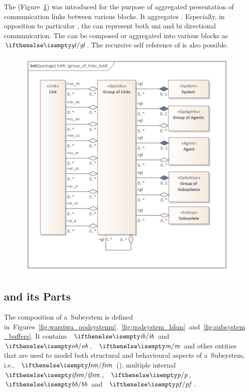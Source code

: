 \documentclass[11pt,oneside,a4paper]{article}
\newcommand{\Figure}[0]{Figure}
\newcommand{\Figures}[0]{Figures}
\begin{document}
The \GroupofLinks{} (\Figure{}~\ref{fig:group_of_links_bdd}) was introduced for the purpose of aggregated presentation of communication links between various blocks. It aggregates \Links{}. Especially, in opposition to particular \Links{}, the \GroupofLinks{} can represent both uni and bi directional communication. The \GroupofLinks{} can be composed or aggregated into various blocks as $\egl{}$. The recursive self reference of \GroupsofLinks{} is also possible.
	
\begin{figure}[H]
	\centering
	\begin{center}
		{\includegraphics[width=.65\columnwidth]{img/basic_earl_model/group_of_links_bdd.png}}
	\end{center}
	\caption{\GroupofLinks{}} 
	\label{fig:group_of_links_bdd}
\end{figure}	

	
	\subsection{\Subsystem{} and its Parts}
	The composition of a~Subsystem{} is defined in~\Figures{}~\ref{fig:warstwa_podsystemu},~\ref{fig:podsystem_hfsm}~and~\ref{fig:subsystem_buffers}. It contains \InputBuffers{}~$\eib{}$ and \OutputBuffers{}~$\eob{}$,
	\InternalMemory{}~$\emb{}$ and other entities that are used to model both structural and behavioural aspects of a~Subsystem{},
	i.e., \Fsm{}~$\efsm{}$ (\FiniteStateMachine{}), multiple internal \FiniteStateMachines{}~$\eifsm{}$, \Predicates{}~$\ep{}$, \BasicBehaviours{}~$\ebb{}$ and \PrimitiveTransitionFunctions{}~$\epf{}$.
	
\end{document}

